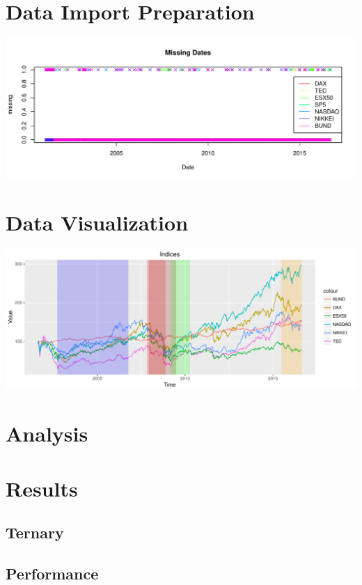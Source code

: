 \documentclass{scrbook}
\begin{document}
\chapter{Data Import Preparation}
\includegraphics[width=\textwidth]{missingDates.pdf}


\chapter{Data Visualization}
\includegraphics[width=\textwidth]{retPlot.pdf}






\chapter{Analysis}




\chapter{Results}

\section{Ternary}
\clearpage


\clearpage
\section{Performance}
\end{document}
